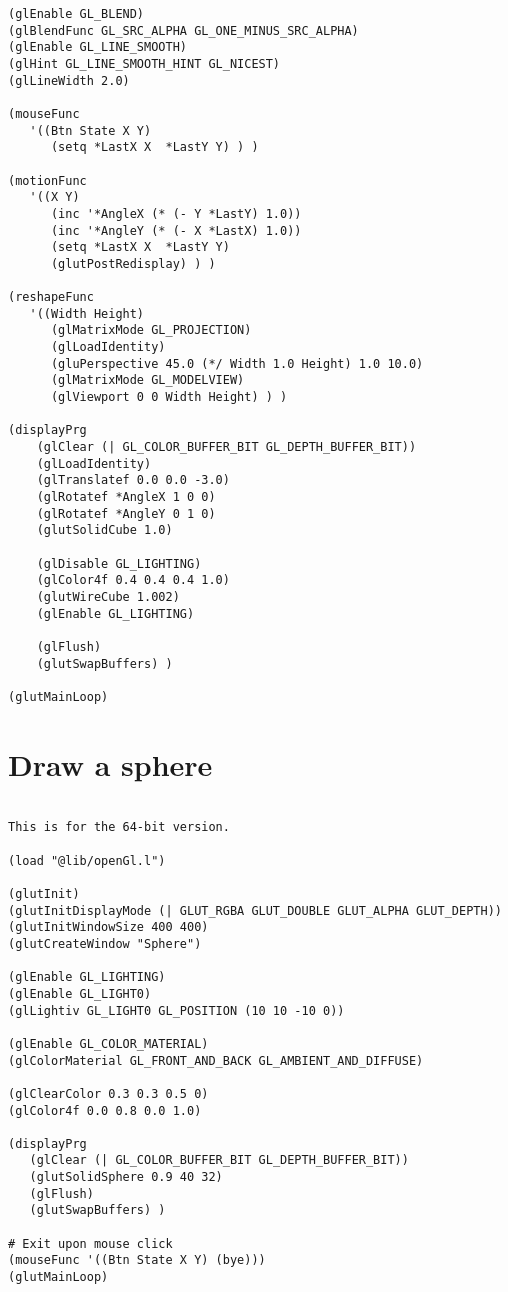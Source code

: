 \begin{verbatim}
(glEnable GL_BLEND)
(glBlendFunc GL_SRC_ALPHA GL_ONE_MINUS_SRC_ALPHA)
(glEnable GL_LINE_SMOOTH)
(glHint GL_LINE_SMOOTH_HINT GL_NICEST)
(glLineWidth 2.0)

(mouseFunc
   '((Btn State X Y)
      (setq *LastX X  *LastY Y) ) )

(motionFunc
   '((X Y)
      (inc '*AngleX (* (- Y *LastY) 1.0))
      (inc '*AngleY (* (- X *LastX) 1.0))
      (setq *LastX X  *LastY Y)
      (glutPostRedisplay) ) )

(reshapeFunc
   '((Width Height)
      (glMatrixMode GL_PROJECTION)
      (glLoadIdentity)
      (gluPerspective 45.0 (*/ Width 1.0 Height) 1.0 10.0)
      (glMatrixMode GL_MODELVIEW)
      (glViewport 0 0 Width Height) ) )

(displayPrg
	(glClear (| GL_COLOR_BUFFER_BIT GL_DEPTH_BUFFER_BIT))
	(glLoadIdentity)
	(glTranslatef 0.0 0.0 -3.0)
	(glRotatef *AngleX 1 0 0)
	(glRotatef *AngleY 0 1 0)
	(glutSolidCube 1.0)
	
	(glDisable GL_LIGHTING)
	(glColor4f 0.4 0.4 0.4 1.0)
	(glutWireCube 1.002)
	(glEnable GL_LIGHTING)
	
	(glFlush)
	(glutSwapBuffers) )

(glutMainLoop)

\end{verbatim}

\section*{Draw a sphere}

\begin{verbatim}

This is for the 64-bit version.

(load "@lib/openGl.l")

(glutInit)
(glutInitDisplayMode (| GLUT_RGBA GLUT_DOUBLE GLUT_ALPHA GLUT_DEPTH))
(glutInitWindowSize 400 400)
(glutCreateWindow "Sphere")

(glEnable GL_LIGHTING)
(glEnable GL_LIGHT0)
(glLightiv GL_LIGHT0 GL_POSITION (10 10 -10 0))

(glEnable GL_COLOR_MATERIAL)
(glColorMaterial GL_FRONT_AND_BACK GL_AMBIENT_AND_DIFFUSE)

(glClearColor 0.3 0.3 0.5 0)
(glColor4f 0.0 0.8 0.0 1.0)

(displayPrg
   (glClear (| GL_COLOR_BUFFER_BIT GL_DEPTH_BUFFER_BIT))
   (glutSolidSphere 0.9 40 32)
   (glFlush)
   (glutSwapBuffers) )

# Exit upon mouse click
(mouseFunc '((Btn State X Y) (bye)))
(glutMainLoop)

\end{verbatim}

